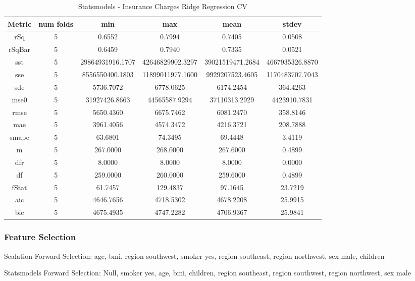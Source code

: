 \documentclass{article}
\begin{document}
\begin{table}[H]
\centering
\caption{Statsmodels - Insurance Charges Ridge Regression CV}
\label{tab:Statsmodels - Insurance Charges Ridge Regression CV}
\begin{tabular}{|c|c|c|c|c|c|}\hline
Metric & num folds & min & max & mean & stdev \\ \hline \hline
rSq & 5 & 0.6552 & 0.7994 & 0.7405 & 0.0508 \\ \hline
rSqBar & 5 & 0.6459 & 0.7940 & 0.7335 & 0.0521 \\ \hline
sst & 5 & 29864931916.1707 & 42646829902.3297 & 39021519471.2684 & 4667935326.8870 \\ \hline
sse & 5 & 8556550400.1803 & 11899011977.1600 & 9929207523.4605 & 1170483707.7043 \\ \hline
sde & 5 & 5736.7072 & 6778.0625 & 6174.2454 & 364.4263 \\ \hline
mse0 & 5 & 31927426.8663 & 44565587.9294 & 37110313.2929 & 4423910.7831 \\ \hline
rmse & 5 & 5650.4360 & 6675.7462 & 6081.2470 & 358.8146 \\ \hline
mae & 5 & 3961.4056 & 4574.3472 & 4216.3721 & 208.7888 \\ \hline
smape & 5 & 63.6801 & 74.3495 & 69.4448 & 3.4119 \\ \hline
m & 5 & 267.0000 & 268.0000 & 267.6000 & 0.4899 \\ \hline
dfr & 5 & 8.0000 & 8.0000 & 8.0000 & 0.0000 \\ \hline
df & 5 & 259.0000 & 260.0000 & 259.6000 & 0.4899 \\ \hline
fStat & 5 & 61.7457 & 129.4837 & 97.1645 & 23.7219 \\ \hline
aic & 5 & 4646.7656 & 4718.5302 & 4678.2208 & 25.9915 \\ \hline
bic & 5 & 4675.4935 & 4747.2282 & 4706.9367 & 25.9841 \\ \hline
\end{tabular}
\end{table}

\subsubsection{Feature Selection}

Scalation Forward Selection: age, bmi, region southwest, smoker yes, region southeast, region northwest, sex male, children

Statsmodels Forward Selection: Null, smoker yes, age, bmi, children, region southeast, region southwest, region northwest, sex male
\end{document}
